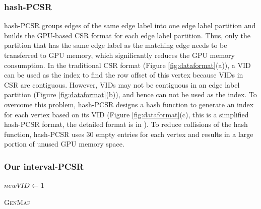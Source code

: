 \subsubsection{hash-PCSR}
hash-PCSR groups edges of the same edge label into one edge label partition and builds the GPU-based CSR format for each edge label partition. Thus, only the partition that has the same edge label as the matching edge needs to be transferred to GPU memory, which significantly reduces the GPU memory consumption. In the traditional CSR format (Figure \ref{fig:dataformat}(a)), a VID can be used as the index to find the row offset of this vertex because VIDs in CSR are contiguous. However, VIDs may not be contiguous in an edge label partition (Figure \ref{fig:dataformat}(b)), and hence can not be used as the index. To overcome this problem, hash-PCSR designs a hash function to generate an index for each vertex based on its VID (Figure \ref{fig:dataformat}(c), this is a simplified hash-PCSR format, the detailed format is in \cite{zeng2020gsi}). To reduce collisions of the hash function, hash-PCSR uses 30 empty entries for each vertex and results in a large portion of unused GPU memory space.
\subsubsection{Our interval-PCSR}
\begin{algorithm}[t!]
$newVID \leftarrow 1$\;
\caption{\textsc{GenMap}}
\label{algo:genmap}
\end{algorithm}

